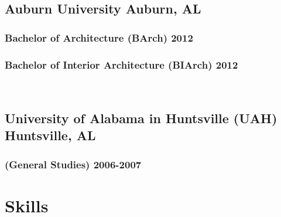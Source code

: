 \documentclass[letterpaper, oneside, 10pt]{article}
\begin{document}
\subsection*{Auburn University\DotSep{0.25em} Auburn, AL}
  \subsubsection*{Bachelor of Architecture (BArch)\DotSep{0.25em} 2012}
  \vspace{-6.5pt}
  \subsubsection*{Bachelor of Interior Architecture (BIArch)\DotSep{0.25em} 2012}
    \\


\subsection*{%
  University of Alabama in Huntsville (UAH)%
  \DotSep{0.25em} Huntsville, AL%
}
  \subsubsection*{(General Studies)\DotSep{0.25em} 2006-2007}



\section*{Skills} %
\AdjSectSpace%
\end{document}
